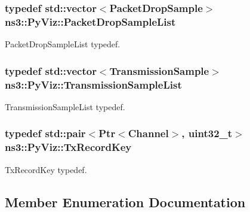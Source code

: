 \subsubsection[{\texorpdfstring{Packet\+Drop\+Sample\+List}{PacketDropSampleList}}]{\setlength{\rightskip}{0pt plus 5cm}typedef std\+::vector$<${\bf Packet\+Drop\+Sample}$>$ {\bf ns3\+::\+Py\+Viz\+::\+Packet\+Drop\+Sample\+List}}\hypertarget{classns3_1_1PyViz_ad627eb91de7132e002dcd50e9d9248cd}{}\label{classns3_1_1PyViz_ad627eb91de7132e002dcd50e9d9248cd}


Packet\+Drop\+Sample\+List typedef. 

\subsubsection[{\texorpdfstring{Transmission\+Sample\+List}{TransmissionSampleList}}]{\setlength{\rightskip}{0pt plus 5cm}typedef std\+::vector$<${\bf Transmission\+Sample}$>$ {\bf ns3\+::\+Py\+Viz\+::\+Transmission\+Sample\+List}}\hypertarget{classns3_1_1PyViz_afef07a5e33f074ff5759906b90b885fb}{}\label{classns3_1_1PyViz_afef07a5e33f074ff5759906b90b885fb}


Transmission\+Sample\+List typedef. 

\subsubsection[{\texorpdfstring{Tx\+Record\+Key}{TxRecordKey}}]{\setlength{\rightskip}{0pt plus 5cm}typedef std\+::pair$<${\bf Ptr}$<${\bf Channel}$>$, uint32\+\_\+t$>$ {\bf ns3\+::\+Py\+Viz\+::\+Tx\+Record\+Key}\hspace{0.3cm}{\ttfamily [private]}}\hypertarget{classns3_1_1PyViz_afe99c7883d8999b0d669eceda3254caf}{}\label{classns3_1_1PyViz_afe99c7883d8999b0d669eceda3254caf}


Tx\+Record\+Key typedef. 



\subsection{Member Enumeration Documentation}

